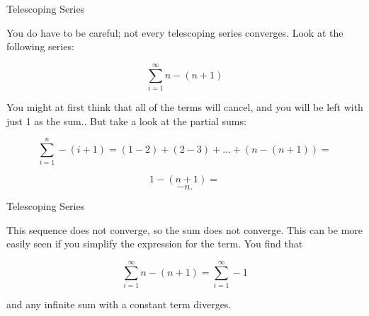 
{Telescoping Series}

You do have to be careful; not every telescoping series converges. Look at the following series:

\[   \sum^{\infty}_{i=1} n - (n + 1) \]

You might at first think that all of the terms will cancel, and you will be left with just 1 as the sum.. But take a look at the partial sums:

\[   \sum^{n}_{i=1} - (i + 1) = (1 - 2) + (2 - 3) + \ldots + (n - (n + 1)) =\]

\[1 - (n + 1) =\]
\[-n.\]



	{Telescoping Series}
	
This sequence does not converge, so the sum does not converge. This can be more easily seen if you simplify the expression for the term. You find that

\[   \sum^{\infty}_{i=1} n - (n + 1) = \sum^{\infty}_{i=1} -1 \]

and any infinite sum with a constant term diverges.
	


